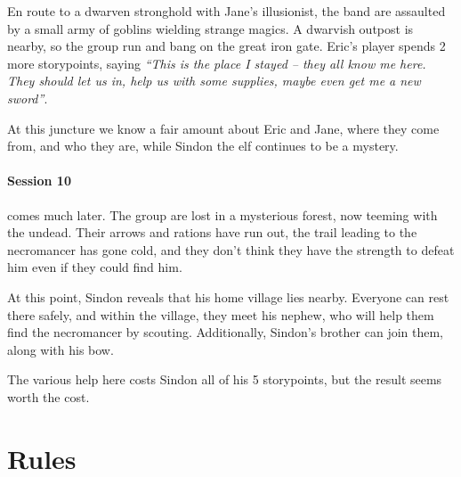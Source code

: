 \begin{multicols}{2}
En route to a dwarven stronghold with Jane's illusionist, the band are assaulted by a small army of goblins wielding strange magics.
A dwarvish outpost is nearby, so the group run and bang on the great iron gate.  Eric's player spends 2 more \glspl{storypoint}, saying \textit{``This is the place I stayed -- they all know me here.
They should let us in, help us with some supplies, maybe even get me a new sword''}.

At this juncture we know a fair amount about Eric and Jane, where they come from, and who they are, while Sindon the elf continues to be a mystery.

\paragraph{Session 10} comes much later.
The group are lost in a mysterious forest, now teeming with the undead.
Their arrows and rations have run out, the trail leading to the necromancer has gone cold, and they don't think they have the strength to defeat him even if they could find him.

At this point, Sindon reveals that his home village lies nearby.
Everyone can rest there safely, and within the village, they meet his nephew, who will help them find the necromancer by scouting.
Additionally, Sindon's brother can join them, along with his bow.

The various help here costs Sindon all of his 5 \glspl{storypoint}, but the result seems worth the cost.

\end{multicols}

\section{ Rules}

